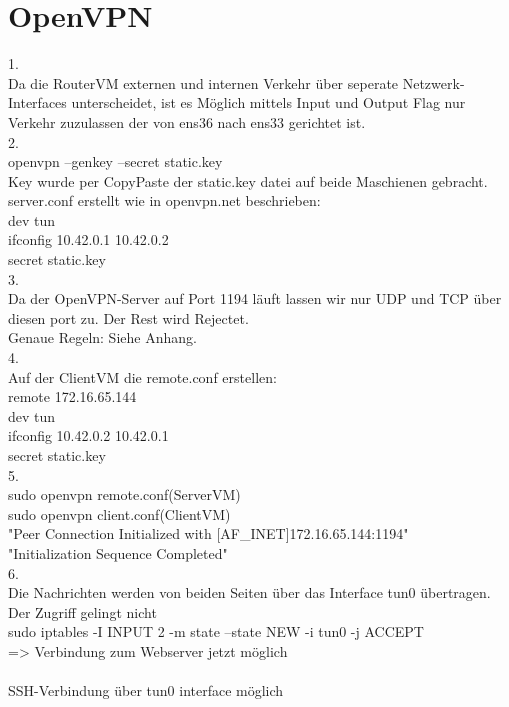 \documentclass[12pt]{article}
\theoremstyle{plain}
\begin{document}
\section{OpenVPN}
1.\\
Da die RouterVM externen und internen Verkehr über seperate Netzwerk-Interfaces unterscheidet, ist es Möglich mittels Input und Output Flag nur Verkehr zuzulassen der von ens36 nach ens33 gerichtet ist.\\
2.\\
openvpn --genkey --secret static.key\\
Key wurde per CopyPaste der static.key datei auf beide Maschienen gebracht.\\
server.conf erstellt wie in openvpn.net beschrieben:\\
dev tun\\
ifconfig 10.42.0.1 10.42.0.2\\
secret static.key\\
3.\\
Da der OpenVPN-Server auf Port 1194 läuft lassen wir nur UDP und TCP über diesen port zu. Der Rest wird Rejectet.\\
Genaue Regeln: Siehe Anhang.\\
4.\\
Auf der ClientVM die remote.conf erstellen:\\
remote 172.16.65.144\\
dev tun\\
ifconfig 10.42.0.2 10.42.0.1\\
secret static.key\\
5.\\
sudo openvpn remote.conf(ServerVM)\\
sudo openvpn client.conf(ClientVM)\\
"Peer Connection Initialized with [AF\_INET]172.16.65.144:1194"\\
"Initialization Sequence Completed"\\
6.\\
Die Nachrichten werden von beiden Seiten über das Interface tun0 übertragen.\\
Der Zugriff gelingt nicht\\
sudo iptables -I INPUT 2 -m state --state NEW -i tun0 -j ACCEPT\\
=> Verbindung zum Webserver jetzt möglich\\\\
SSH-Verbindung über tun0 interface möglich\\
\end{document}
